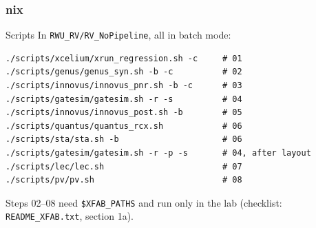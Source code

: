 \documentclass{beamer}
\newcommand{\astitle}{nix}
\newcommand{\assubtitle}{nix}
\newcommand{\cmd}[1]{\texttt{#1}}
\begin{document}
\renewcommand{\assubtitle}{Scripts}
\begin{frame}[fragile]
\frametitle{\astitle}
\begin{block}{\assubtitle}
  \scriptsize
  In \cmd{RWU\_RV/RV\_NoPipeline}, all in batch mode:
\begin{lstlisting}[style=sh]
./scripts/xcelium/xrun_regression.sh -c     # 01
./scripts/genus/genus_syn.sh -b -c          # 02
./scripts/innovus/innovus_pnr.sh -b -c      # 03
./scripts/gatesim/gatesim.sh -r -s          # 04
./scripts/innovus/innovus_post.sh -b        # 05
./scripts/quantus/quantus_rcx.sh            # 06
./scripts/sta/sta.sh -b                     # 06
./scripts/gatesim/gatesim.sh -r -p -s       # 04, after layout
./scripts/lec/lec.sh                        # 07
./scripts/pv/pv.sh                          # 08
\end{lstlisting}
  Steps 02--08 need \cmd{\$XFAB\_PATHS} and run only in the lab
  (checklist: \cmd{README\_XFAB.txt}, section 1a).
\end{block}
\end{frame}
\end{document}
